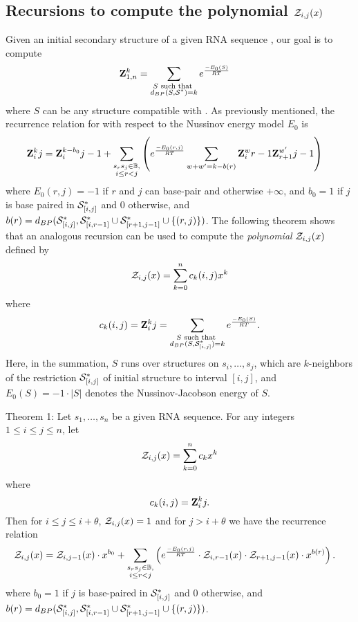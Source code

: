 \subsection*{Recursions to compute the polynomial ${\mathcal Z}_{i,j}(x)$}
\label{section:recursionsForPolynomialZij}

Given an initial secondary structure \strSt of a
given RNA sequence \seq, our goal is to compute
\begin{align}
\label{eqn:defZk}
\bfZ{k}{1,n} &= \sum_{\substack{S \text{ such that }\\ d_{BP}(S,\strSt)=k}}
e^{\frac{-E_0(S)}{RT}}
\end{align}
where $S$ can be any structure compatible with \seq.
As previously mentioned, the recurrence relation for \rnabor
with respect to the Nussinov energy model $E_0$ is
\begin{align}
\label{eqn:RNAborNussRecursion}
\bfZ{k}{i}{j} &= \bfZ{k-b_0}{i}{j-1} + \sum_{\substack{s_r s_j \in \mathbb{B},\\i\le r<j}}\left(e^{\frac{-E_0(r,j)}{RT}}\sum_{w+w'=k-b(r)}
\bfZ{w}{i}{r-1}  \bfZ{w'}{r+1}{j-1} \right)
\end{align}
where $E_0(r,j)=-1$ if $r$ and $j$ can base-pair and otherwise
$+\infty$, and
$b_0 = 1$ if $j$ is base paired in $\mathcal S^*_{[i,j]}$ and $0$ otherwise, and
$b(r)=d_{BP}(\mathcal S^*_{[i,j]}, \mathcal S^*_{[i,r-1]} \cup \mathcal S^*_{[r+1,j-1]} \cup\{(r,j)\})$.
The following theorem shows that an analogous recursion can be used to compute
the {\em polynomial} ${\mathcal Z}_{i,j}(x)$ defined by
\begin{eqnarray}
\label{eqn:defZijpolynomial}
\emZ{i,j} = \sum_{k=0}^n c_k(i,j) x^k
\end{eqnarray}
where
\[ c_k(i,j)= {\bf Z}^{k}_{i}{j} =
\sum_{\substack{S \text{ such that }\\ d_{BP}(S,\mathcal S^*_{[i,j]})=k}}
e^{\frac{-E_0(S)}{RT}}.
\]
Here, in the summation, $S$ runs over structures on $s_i,\ldots,s_j$, which
are $k$-neighbors of the restriction $\mathcal S^*_{[i,j]}$ of initial structure
\strSt to interval $[i,j]$, and
$E_0(S)=-1 \cdot |S|$ denotes the Nussinov-Jacobson energy of $S$.
\medskip

\noindent
{\sc Theorem 1:} Let $s_1,\ldots,s_n$ be a given RNA sequence.
For any integers $1 \leq i \leq j \leq n$, let
\begin{eqnarray*}
{\mathcal Z}_{i,j}(x) = \sum_{k=0}^n c_k x^k
\end{eqnarray*}
where
\[ c_k(i,j)= {\bf Z}^{k}_{i}{j}.
\]
Then  for $i\leq j \leq i+\theta$, ${\mathcal Z}_{i,j}(x)=1$ and for
$j>i+\theta$ we have the recurrence relation
\begin{eqnarray}
\label{eqn:polynomialRecursionNussJac}
\emZ{i,j} &= \emZ{i,j-1} \cdot x^{b_0} +
\sum_{\substack{s_r s_j \in \mathbb{B},\\i\le r<j}}
\left(e^{\frac{-E_0(r,j)}{RT}}\cdot
\emZ{i,r-1}\cdot\emZ{r+1,j-1}\cdot x^{b(r)} \right).
\end{eqnarray}
\medskip
where $b_0 = 1$ if $j$ is base-paired in $\mathcal S^*_{[i,j]}$ and $0$ otherwise, and
$b(r)=d_{BP}(\mathcal S^*_{[i,j]}, \mathcal S^*_{[i,r-1]} \cup \mathcal S^*_{[r+1,j-1]} \cup\{(r,j)\})$.

